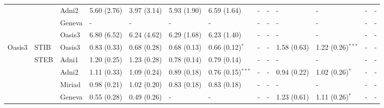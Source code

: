 \begin{table*}
{\begin{tabular}{lllllllllllll}
       &                 & Adni2           &  5.60 (2.76) &  3.97 (3.14)       &  5.93 (1.90) &  6.59 (1.64)         &            - &            -         &            - &            -         &            - &            -         \\
       &                 & Geneva          &            - &            -       &            - &            -         &            - &            -         &            - &            -         &            - &            -         \\
       &                 & Oasis3          &  6.80 (6.52) &  6.24 (4.62)       &  6.29 (1.68) &  6.23 (1.40)         &            - &            -         &            - &            -         &            - &            -         \\
\toprule
Oasis3 &        STIB     & Oasis3          &  0.83 (0.33) &  0.68 (0.28)       &  0.68 (0.13) &  0.66 (0.12)$^{*}$   &            - &            -         &  1.58 (0.63) &  1.22 (0.26)$^{***}$ &            - &            -         \\
\cmidrule(lr){2-13}
       &        STEB  & Adni1           &  1.20 (0.25) &  1.23 (0.28)       &  0.78 (0.14) &  0.79 (0.14)         &            - &            -         &            - &            -         &            - &            -         \\
       &                 & Adni2           &  1.11 (0.33) &  1.09 (0.24)       &  0.89 (0.18) &  0.76 (0.15)$^{***}$ &            - &            -         &  0.94 (0.22) &  1.02 (0.26)$^{*}$   &            - &            -         \\
       &                 & Miriad          &  0.98 (0.21) &  1.02 (0.20)       &  0.83 (0.18) &  0.83 (0.18)         &            - &            -         &            - &            -         &            - &            -         \\
       &                 & Geneva          &  0.55 (0.28) &  0.49 (0.26)       &            - &            -         &            - &            -         &  1.23 (0.61) &  1.11 (0.26)$^{*}$   &            - &            -         \\
\bottomrule
\end{tabular}}
\end{table*}

